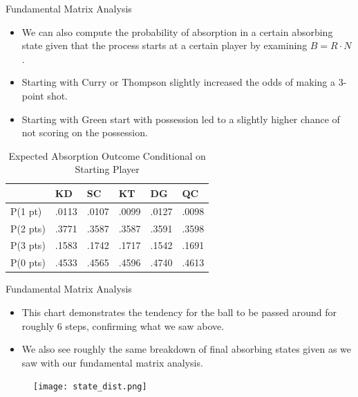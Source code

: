 \documentclass{beamer}
\begin{document}
\begin{frame}{Fundamental Matrix Analysis}
\begin{itemize}
    \item We can also compute the probability of absorption in a certain absorbing state given that the process starts at a certain player by examining $B=R\cdot N$.
    \item Starting with Curry or Thompson slightly increased the odds of making a 3-point shot.
    \item Starting with Green start with possession led to a slightly higher chance of not scoring on the possession.
\end{itemize}
\begin{table}[H]
\centering
\begin{tabular}{l|l|l|l|l|l}
         & KD & SC & KT & DG & QC \\ \hline
P(1 pt)  & .0113   & .0107   & .0099   & .0127   & .0098   \\ \hline
P(2 pts) & .3771   & .3587   & .3587   & .3591   & .3598   \\ \hline
P(3 pts) & .1583   & .1742   & .1717   & .1542   & .1691   \\ \hline
P(0 pts) & .4533   & .4565   & .4596   & .4740   & .4613   \\ 
\end{tabular}
\caption{Expected Absorption Outcome Conditional on Starting Player}
\end{table}
\end{frame}

\begin{frame}{Fundamental Matrix Analysis}
\begin{itemize}
    \item This chart demonstrates the tendency for the ball to be passed around for roughly 6 steps, confirming what we saw above.
    \item We also see roughly the same breakdown of final absorbing states given as we saw with our fundamental matrix analysis.
\end{itemize}
\begin{figure}
    \centering
    \texttt{[image: state\_dist.png]}
\end{figure}
\end{frame}
\end{document}
